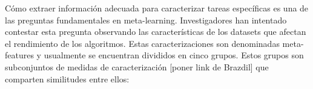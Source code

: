 
Cómo extraer información adecuada para caracterizar tareas específicas es una de las preguntas fundamentales en meta-learning. Investigadores han intentado contestar esta pregunta observando las características de los datasets que afectan el rendimiento de los algoritmos. Estas caracterizaciones son denominadas meta-features y usualmente se encuentran divididos en cinco grupos. Estos grupos son subconjuntos de medidas de caracterización [poner link de Brazdil] que comparten similitudes entre ellos:



